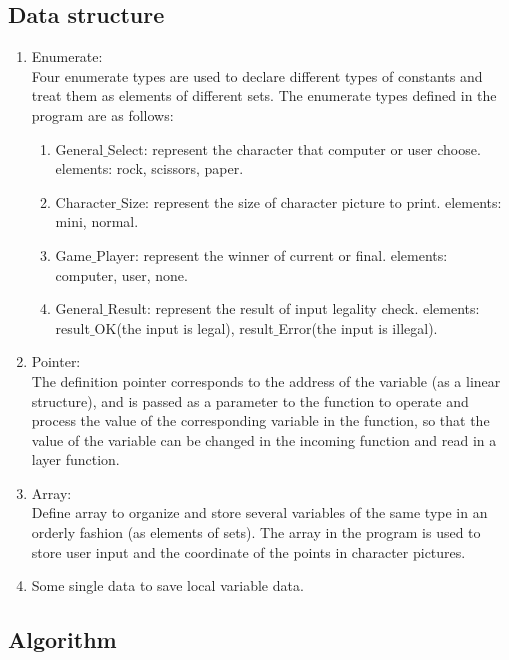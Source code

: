 \documentclass[12pt]{article}
\begin{document}
	\subsection{Data structure}
	
	\begin{enumerate}
		\item Enumerate:\\
		Four enumerate types are used to declare different types of constants and treat them as elements of different sets. The enumerate types defined in the program are as follows:
		
		\begin{enumerate}[$\bullet$]
			\item General$\_$Select: represent the character that computer or user choose.
			elements: rock, scissors, paper.
			\item Character$\_$Size: represent the size of character picture to print.
			elements: mini, normal.
			\item Game$\_$Player: represent the winner of current or final.
			elements: computer, user, none.
			\item General$\_$Result: represent the result of input legality check.
			elements: result$\_$OK(the input is legal), result$\_$Error(the input is illegal).
		\end{enumerate}
		
		\item Pointer:\\
		The definition pointer corresponds to the address of the variable (as a linear structure), and is passed as a parameter to the function to operate and process the value of the corresponding variable in the function, so that the value of the variable can be changed in the incoming function and read in a layer function.
		
		\item Array:\\
		Define array to organize and store several variables of the same type in an orderly fashion (as elements of sets). The array in the program is used to store user input and the coordinate of the points in character pictures.
		
		\item Some single data to save local variable data.
	\end{enumerate}

	\subsection{Algorithm}
	
\end{document}
